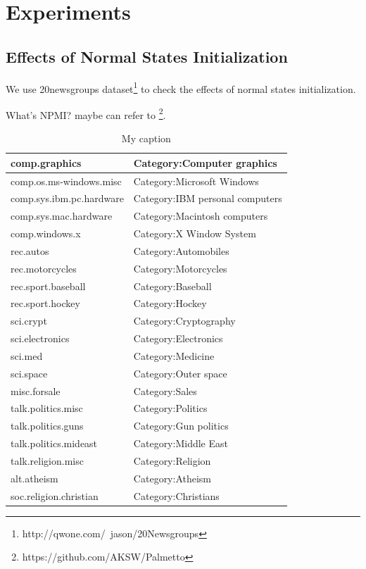 \documentclass[11pt]{article}
\begin{document}
\section{Experiments}
\subsection{Effects of Normal States Initialization}
We use 20newsgroups\cite{lang1995newsweeder} dataset\footnote{http://qwone.com/~jason/20Newsgroups} to check the effects of normal states initialization.


What's NPMI? maybe can refer to \cite{Aletras2013EvaluatingTC}\cite{Rder2015ExploringTS}\footnote{https://github.com/AKSW/Palmetto}.
\begin{table}[]
\centering
\caption{My caption}
\label{my-label}
\begin{tabular}{|l|l|}
\hline
comp.graphics            & Category:Computer graphics      \\ \hline
comp.os.ms-windows.misc  & Category:Microsoft Windows      \\ \hline
comp.sys.ibm.pc.hardware & Category:IBM personal computers \\ \hline
comp.sys.mac.hardware    & Category:Macintosh computers    \\ \hline
comp.windows.x           & Category:X Window System        \\ \hline
rec.autos                & Category:Automobiles            \\ \hline
rec.motorcycles          & Category:Motorcycles            \\ \hline
rec.sport.baseball       & Category:Baseball               \\ \hline
rec.sport.hockey         & Category:Hockey                 \\ \hline
sci.crypt                & Category:Cryptography           \\ \hline
sci.electronics          & Category:Electronics            \\ \hline
sci.med                  & Category:Medicine               \\ \hline
sci.space                & Category:Outer space            \\ \hline
misc.forsale             & Category:Sales                  \\ \hline
talk.politics.misc       & Category:Politics               \\ \hline
talk.politics.guns       & Category:Gun politics          \\ \hline
talk.politics.mideast    & Category:Middle East           \\ \hline
talk.religion.misc       & Category:Religion               \\ \hline
alt.atheism              & Category:Atheism                \\ \hline
soc.religion.christian   & Category:Christians             \\ \hline
\end{tabular}
\end{table}
\end{document}

